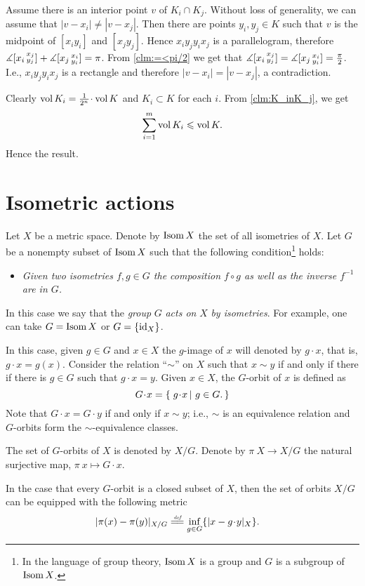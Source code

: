 Assume there is an interior point $v$ of $K_i\cap K_j$.
Without loss of generality, we can assume that $|v-x_i|\ne |v-x_j|$. 
Then there are points $y_i, y_j\in K$ such that
$v$ is the midpoint of $[x_iy_i]$ and $[x_jy_j]$.
Hence $x_iy_jy_ix_j$ is a parallelogram,
therefore $\measuredangle[x_i\,{}^{x_j}_{y_j}]+\measuredangle[x_j\,{}^{x_i}_{y_i}]=\pi$.
From \ref{clm:=<pi/2} we get that $\measuredangle[x_i\,{}^{x_j}_{y_j}]=\measuredangle[x_j\,{}^{x_i}_{y_i}]=\tfrac\pi2$.
I.e., $x_iy_jy_ix_j$ is a rectangle and therefore $|v-x_i|= |v-x_j|$, a contradiction.

Clearly $\vol K_i=\tfrac1{2^n}\cdot\vol K$ and $K_i\subset K$ for each $i$.
From \ref{clm:K_inK_j}, we get
$$\sum_{i=1}^m\operatorname{vol} K_i\leqslant \operatorname{vol} K.$$
Hence the result.
\qeds


\section{Isometric actions}

Let $X$ be a metric space.
Denote by $\operatorname{Isom} X$ the set of all isometries of $X$.
Let $G$ be a nonempty subset of $\operatorname{Isom} X$ such that the following condition\footnote{In the language of group theory, $\operatorname{Isom} X$ is a group and $G$ is a subgroup of $\operatorname{Isom} X$.} holds:
\medskip
\begin{itemize}
\item \textit{Given two isometries $f,g\in G$
 the composition $f\circ g$ as well as the inverse $f^{-1}$ are in $G$.}
\end{itemize}
\medskip
In this case we say that the \emph{group} $G$ \emph{acts on} $X$ \emph{by isometries}.
For example, one can take $G=\operatorname{Isom} X$ or $G=\{\operatorname{id}_X\}$.

In this case, given $g\in G$ and $x\in X$ the $g$-image of $x$ will denoted by $g\cdot x$, that is, $g\cdot x = g(x)$.
Consider the relation ``$\sim$'' on $X$ such that $x\sim y$ 
if and only if there if there is $g\in G$ such that $g\cdot x=y$.
Given $x\in X$, the $G$-orbit of $x$ is defined as
$$G\cdot x=\set{g\cdot x}{g\in G.}$$
Note that $G\cdot x=G\cdot y$ if and only if $x\sim y$;
i.e., $\sim$ is an equivalence relation and $G$-orbits form the $\sim$-equivalence classes.

The set of $G$-orbits of $X$ is denoted by $X/G$. 
Denote by $\pi\:X\to X/G$ the natural surjective map, $\pi\:x\mapsto G\cdot x$.

In the case that every $G$-orbit is a closed subset of $X$, 
then the set of orbits $X/G$ can be equipped with the following metric
\begin{align*}
|\pi(x)-\pi(y)|_{X/G}
&\df\inf_{g\in G}\{|x-g\cdot y|_X\}.
\end{align*}


